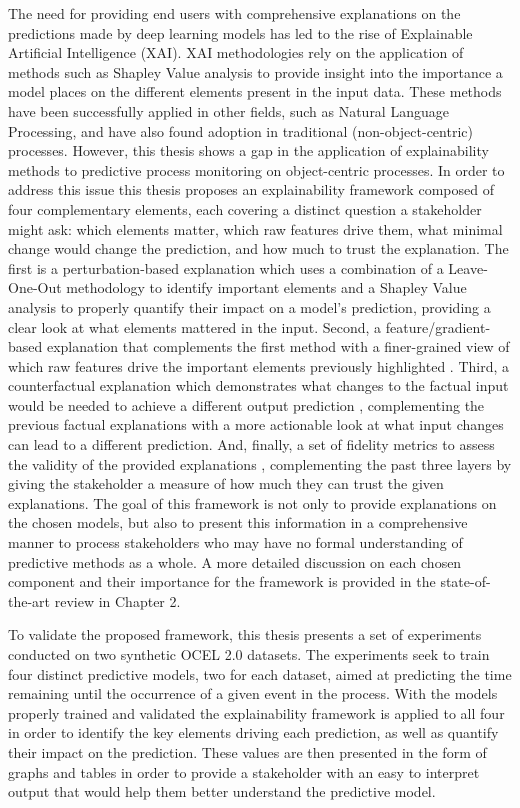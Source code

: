 The need for providing end users with comprehensive explanations on the predictions made by deep learning models has led to the rise of Explainable Artificial Intelligence (XAI). XAI methodologies rely on the application of methods such as Shapley Value analysis to provide insight into the importance a model places on the different elements present in the input data. These methods have been successfully applied in other fields, such as Natural Language Processing, and have also found adoption in traditional (non-object-centric) processes. However, this thesis shows a gap in the application of explainability methods to predictive process monitoring on object-centric processes. In order to address this issue this thesis proposes an explainability framework composed of four complementary elements, each covering a distinct question a stakeholder might ask: which elements matter, which raw features drive them, what minimal change would change the prediction, and how much to trust the explanation. The first is a perturbation-based explanation which uses a combination of a Leave-One-Out methodology \cite{limonroejurafsky2017} to identify important elements and a Shapley Value analysis \cite{castro2009} to properly quantify their impact on a model's prediction, providing a clear look at what elements mattered in the input. Second, a feature/gradient-based explanation that complements the first method with a finer-grained view of which raw features drive the important elements previously highlighted \cite{sundararajan2017}. Third, a counterfactual explanation which demonstrates what changes to the factual input would be needed to achieve a different output prediction \cite{huang2022}, complementing the previous factual explanations with a more actionable look at what input changes can lead to a different prediction. And, finally, a set of fidelity metrics to assess the validity of the provided explanations \cite{stevens2022}, complementing the past three layers by giving the stakeholder a measure of how much they can trust the given explanations. The goal of this framework is not only to provide explanations on the chosen models, but also to present this information in a comprehensive manner to process stakeholders who may have no formal understanding of predictive methods as a whole. A more detailed discussion on each chosen component and their importance for the framework is provided in the state-of-the-art review in Chapter 2.

To validate the proposed framework, this thesis presents a set of experiments conducted on two synthetic OCEL 2.0 datasets. The experiments seek to train four distinct predictive models, two for each dataset, aimed at predicting the time remaining until the occurrence of a given event in the process. With the models properly trained and validated the explainability framework is applied to all four in order to identify the key elements driving each prediction, as well as quantify their impact on the prediction. These values are then presented in the form of graphs and tables in order to provide a stakeholder with an easy to interpret output that would help them better understand the predictive model. 


